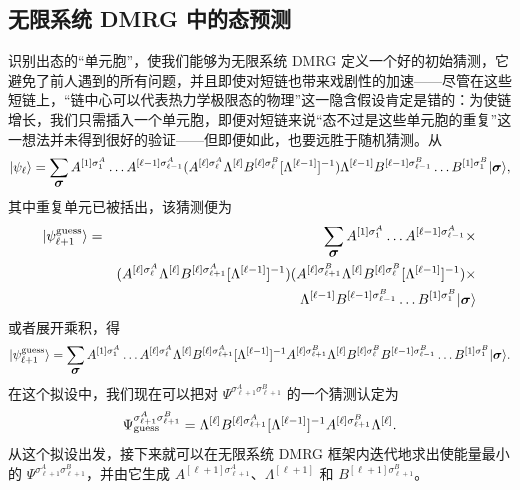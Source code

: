 \documentclass[a4paper,10pt,oneside,onecolumn,1p,times]{elsarticle}
\newcommand{\ket}[1]{\mbox{$| #1  \rangle$}}
\newcommand{\fat}[1]{\mbox{\boldmath$#1$\unboldmath}}	%
\begin{document}
\subsection{无限系统 DMRG 中的态预测} 
识别出态的``单元胞''，使我们能够为无限系统 DMRG 定义一个好的初始猜测\cite{McCulloch08}，它避免了前人遇到的所有问题，并且即使对短链也带来戏剧性的加速——尽管在这些短链上，``链中心可以代表热力学极限态的物理''这一隐含假设肯定是错的：为使链增长，我们只需插入一个单元胞，即便对短链来说``态不过是这些单元胞的重复''这一想法并未得到很好的验证——但即便如此，也要远胜于随机猜测。从
\begin{equation}
\ket{\psi_{\ell}} =  \sum_{\fat{\sigma}} A^{[1]\sigma_1^A} \ldots A^{[\ell-1]\sigma_{\ell-1}^A} (A^{[\ell]\sigma_\ell^A} \Lambda^{[\ell]} B^{[\ell]\sigma_\ell^B} [\Lambda^{[\ell-1]}]^{-1}) \Lambda^{[\ell-1]} B^{[\ell-1]\sigma_{\ell-1}^B} \ldots B^{[1]\sigma_1^B} \ket{\fat{\sigma}},
\end{equation} 
其中重复单元已被括出，该猜测便为
\begin{eqnarray}
\ket{\psi_{\ell+1}^{{\rm guess}}} &=& \sum_{\fat{\sigma}} A^{[1]\sigma_1^A} \ldots  A^{[\ell-1]\sigma_{\ell-1}^A} \times \nonumber \\
& & ( A^{[\ell]\sigma_\ell^A} \Lambda^{[\ell]} B^{[\ell]\sigma_{\ell+1}^A} [\Lambda^{[\ell-1]}]^{-1} ) (A^{[\ell]\sigma_{\ell+1}^B} \Lambda^{[\ell]} B^{[\ell]\sigma_\ell^B}  
[\Lambda^{[\ell-1]}]^{-1} ) \times \nonumber \\
& &  \Lambda^{[\ell-1]} B^{[\ell-1]\sigma_{\ell-1}^B} \ldots B^{[1]\sigma_1^B} \ket{\fat{\sigma}} 
\end{eqnarray}
或者展开乘积，得 
\begin{equation}
\ket{\psi_{\ell+1}^{{\rm guess}}} = \sum_{\fat{\sigma}} A^{[1]\sigma_1^A} \ldots A^{[\ell]\sigma_\ell^A} \Lambda^{[\ell]} B^{[\ell]\sigma_{\ell+1}^A} [\Lambda^{[\ell-1]}]^{-1} A^{[\ell]\sigma_{\ell+1}^B} \Lambda^{[\ell]} B^{[\ell]\sigma_\ell^B} B^{[\ell-1]\sigma_{\ell-1}^B} \ldots B^{[1]\sigma_1^B} \ket{\fat{\sigma}} .
\end{equation}
在这个拟设中，我们现在可以把对 $\Psi^{\sigma_{\ell+1}^A\sigma_{\ell+1}^B}$ 的一个猜测认定为
\begin{equation}
\Psi^{\sigma_{\ell+1}^A\sigma_{\ell+1}^B}_{{\rm guess}} =
\Lambda^{[\ell]} B^{[\ell]\sigma_{\ell+1}^A} [\Lambda^{[\ell-1]}]^{-1} A^{[\ell]\sigma_{\ell+1}^B} \Lambda^{[\ell]} .
\label{eq:guess2sites}
\end{equation}
从这个拟设出发，接下来就可以在无限系统 DMRG 框架内迭代地求出使能量最小的 $\Psi^{\sigma_{\ell+1}^A\sigma_{\ell+1}^B}$，并由它生成 $A^{[\ell+1]\sigma_{\ell+1}^A}$、$\Lambda^{[\ell+1]}$ 和 $B^{[\ell+1]\sigma_{\ell+1}^B}$。
\end{document}
